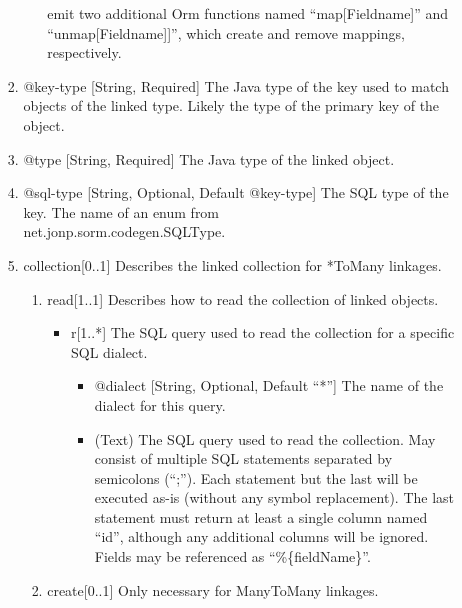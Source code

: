 \documentclass{book}
\begin{document}
\begin{enumerate}
\begin{enumerate}
\begin{enumerate}
\begin{itemize}
                emit two additional Orm functions named ``map[Fieldname]'' and
                ``unmap[Fieldname]]'', which create and remove mappings,
                respectively.
            \end{itemize}
            \item @key-type [String, Required] The Java type of the key used to
                  match objects of the linked type. Likely the type of the
                  primary key of the object.
            \item @type [String, Required] The Java type of the linked object.
            \item @sql-type [String, Optional, Default @key-type] The SQL type
                  of the key. The name of an enum from\\
                  net.jonp.sorm.codegen.SQLType.
            \item collection[0..1] Describes the linked collection for *ToMany
                  linkages.
            \begin{enumerate}
                \item read[1..1] Describes how to read the collection of linked
                      objects.
                \begin{itemize}
                    \item r[1..*] The SQL query used to read the collection for
                          a specific SQL dialect.
                    \begin{itemize}
                        \item @dialect [String, Optional, Default ``*''] The
                              name of the dialect for this query.
                        \item (Text) The SQL query used to read the collection.
                              May consist of multiple SQL statements separated
                              by semicolons (``;''). Each statement but the last
                              will be executed as-is (without any symbol
                              replacement). The last statement must return at
                              least a single column named ``id'', although any
                              additional columns will be ignored. Fields may be
                              referenced as ``\%\{fieldName\}''.
                    \end{itemize}
                \end{itemize}
                \item create[0..1] Only necessary for ManyToMany linkages.

\end{enumerate}
\end{enumerate}
\end{enumerate}
\end{enumerate}
\end{document}
